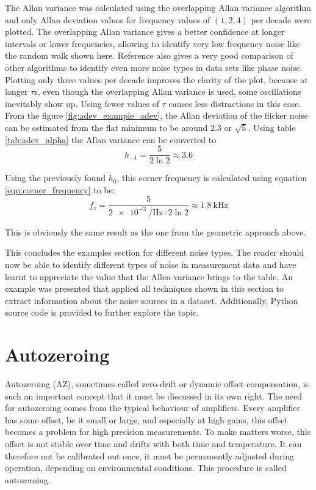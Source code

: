 The Allan variance was calculated using the overlapping Allan variance algorithm \cite{oadev_definition} and only Allan deviation values for frequency values of $(1, 2, 4)$ per decade were plotted. The overlapping Allan variance gives a better confidence at longer intervals or lower frequencies, allowing to identify very low frequency noise like the random walk shown here. Reference \cite{oadev_definition} also gives a very good comparison of other algorithms to identify even more noise types in data sets like phase noise. Plotting only three values per decade improves the clarity of the plot, because at longer $\tau$s, even though the overlapping Allan variance is used, some oscillations inevitably show up. Using fewer values of $\tau$ causes less distractions in this case.
From the figure \ref{fig:adev_example_adev}, the Allan deviation of the flicker noise can be estimated from the flat minimum to be around $2.3$ or $\sqrt{5}$. Using table \ref{tab:adev_alpha} the Allan variance can be converted to
\begin{equation*}
    h_{-1} = \frac{5}{2 \ln 2} \approx 3.6
\end{equation*}

Using the previously found $h_0$, this corner frequency is calculated using equation \ref{eqn:corner_frequency} to be:
\begin{equation*}
    f_c = \frac{5}{\qty{2e-3}{\per \Hz} \cdot 2 \ln 2} \approx \qty{1.8}{\kHz}
\end{equation*}

This is obviously the same result as the one from the geometric approach above.

This concludes the examples section for different noise types. The reader should now be able to identify different types of noise in measurement data and have learnt to appreciate the value that the Allen variance brings to the table. An example was presented that applied all techniques shown in this section to extract information about the noise sources in a dataset. Additionally, Python source code is provided to further explore the topic.

\clearpage
\section{Autozeroing}%
\label{sec:autozero}
Autozeroing (AZ), sometimes called zero-drift or dynamic offset compensation, is such an important concept that it must be discussed in its own right. The need for autozeroing comes from the typical behaviour of amplifiers. Every amplifier has some offset, be it small or large, and especially at high gains, this offset becomes a problem for high precision measurements. To make matters worse, this offset is not stable over time and drifts with both time and temperature. It can therefore not be calibrated out once, it must be permanently adjusted during operation, depending on environmental conditions. This procedure is called autozeroing.

